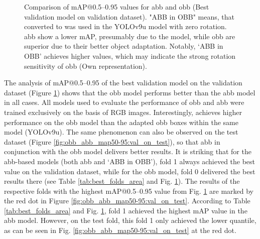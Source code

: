 \begin{figure}[htbp]
    \centering
    
    \caption[Comparison of \acrshort{mAP}@0.5--0.95 values for \acrshort{abb} and \acrshort{obb} (Best validation model on validation dataset)]{Comparison of \acrshort{mAP}@0.5--0.95 values for \acrshort{abb} and \acrshort{obb} (Best validation model on validation dataset). "ABB in OBB" means, that  converted to  was used in the \acrshort{YOLO}v9u model with zero rotation. \acrshort{abb} show a lower \acrshort{mAP}, presumably due to the model, while \acrshort{obb} are superior due to their better object adaptation. Notably, ‘ABB in OBB’ achieves higher values, which may indicate the strong rotation sensitivity of \acrshort{obb} (Own representation).}
    \label{fig:obb_abb_map50-95:val_on_val}
\end{figure}
The analysis of \acrshort{mAP}@0.5--0.95 of the best validation model on the validation dataset (Figure \ref{fig:obb_abb_map50-95:val_on_val}) shows that the \acrshort{obb} model performs better than the \acrshort{abb} model in all cases. All models used to evaluate the performance of \acrshort{obb} and \acrshort{abb} were trained exclusively on the basis of \acrshort{RGB} images. Interestingly,  achieves higher performance on the \acrshort{obb} model than the adapted \acrshort{obb} boxes within the same model (\acrshort{YOLO}v9u). The same phenomenon can also be observed on the test dataset (Figure \ref{fig:obb_abb_map50-95:val_on_test}), so that \acrshort{abb} in conjunction with the \acrshort{obb} model delivers better results. It is striking that for the \acrshort{abb}-based models (both \acrshort{abb} and ‘ABB in OBB’), fold 1 always achieved the best value on the validation dataset, while for the \acrshort{obb} model, fold 0 delivered the best results there (see Table \ref{tab:best_folds_area} and Fig. \ref{fig:obb_abb_map50-95:val_on_val}). The results of the respective folds with the highest \acrshort{mAP}@0.5--0.95 value from Fig. \ref{fig:obb_abb_map50-95:val_on_val} are marked by the red dot in Figure \ref{fig:obb_abb_map50-95:val_on_test}. According to Table \ref{tab:best_folds_area} and Fig. \ref{fig:obb_abb_map50-95:val_on_val}, fold 1 achieved the highest \acrshort{mAP} value in the \acrshort{abb} model. However, on the test fold, this fold 1 only achieved the lower quantile, as can be seen in Fig. \ref{fig:obb_abb_map50-95:val_on_test} at the red dot.


